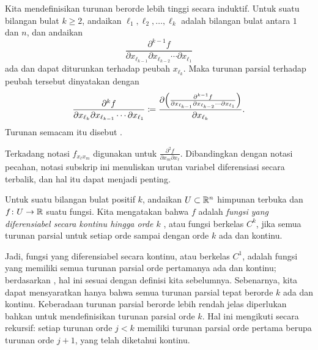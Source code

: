 Kita mendefinisikan turunan berorde lebih tinggi secara induktif.
Untuk suatu bilangan bulat $k \geq 2$, andaikan ${\ell}_1,{\ell}_2,\ldots,{\ell}_k$ adalah bilangan bulat antara $1$ dan $n$, dan
andaikan 
\begin{equation*}
\frac{\partial^{k-1} f}{\partial x_{{\ell}_{k-1}} \partial x_{{\ell}_{k-2}}
\cdots \partial x_{{\ell}_1}}
\end{equation*}
ada dan dapat diturunkan terhadap peubah $x_{{\ell}_{k}}$.
Maka turunan parsial terhadap peubah tersebut dinyatakan dengan
\begin{equation*}
\frac{\partial^{k} f}{\partial x_{{\ell}_{k}} \partial x_{{\ell}_{k-1}}
\cdots \partial x_{{\ell}_1}}
\coloneqq 
\frac{\partial \Bigl( \frac{\partial^{k-1} f}{\partial x_{{\ell}_{k-1}} \partial
x_{{\ell}_{k-2}} \cdots \partial x_{{\ell}_1}} \Bigr)}{\partial x_{{\ell}_{k}}} .
\end{equation*}
Turunan semacam itu disebut
\emph{}.

Terkadang notasi $f_{x_{\ell} x_m}$ digunakan untuk
$\frac{\partial^2 f}{\partial x_m \partial x_{\ell}}$.  Dibandingkan dengan notasi pecahan,
notasi subskrip ini menuliskan urutan variabel diferensiasi secara terbalik, dan hal itu dapat menjadi penting.

\begin{defn}
Untuk suatu bilangan bulat positif $k$, andaikan $U \subset {\mathbb{R}}^n$ himpunan terbuka dan
$f \colon U \to {\mathbb{R}}$ suatu fungsi.  Kita mengatakan bahwa $f$ adalah
\emph{fungsi yang diferensiabel secara kontinu hingga orde $k$}%
,
atau fungsi berkelas $C^k$, jika semua turunan parsial untuk setiap orde
sampai dengan orde $k$ ada dan kontinu.
\end{defn}

Jadi, fungsi yang diferensiabel secara kontinu, atau berkelas $C^1$, adalah fungsi yang memiliki semua
turunan parsial orde pertamanya
ada dan kontinu; berdasarkan , hal ini sesuai dengan
definisi kita sebelumnya.  Sebenarnya, kita
dapat mensyaratkan hanya bahwa semua turunan parsial tepat berorde $k$ ada dan
kontinu.
Keberadaan turunan parsial berorde lebih rendah jelas
diperlukan bahkan untuk mendefinisikan turunan parsial orde $k$.
Hal ini mengikuti secara rekursif: setiap turunan orde $j<k$ memiliki turunan parsial orde pertama
berupa turunan orde $j+1$, yang telah diketahui kontinu.

